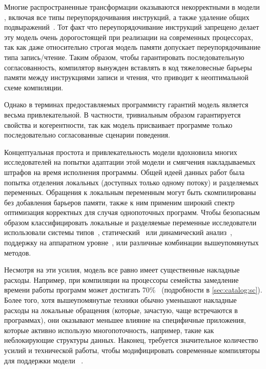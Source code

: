 Многие распространенные трансформации оказываются 
некорректными в модели \SC, включая 
все типы переупорядочивания инструкций, 
а также удаление общих подвыражений~\cite{Marino-al:PLDI11, Sevcik-Aspinall:ECOOP08}.
Тот факт что переупорядочивание инструкций запрещено 
делает эту модель очень дорогостоящей при реализации
на современных процессорах, так как даже 
относительно строгая модель памяти \Intel
допускает переупорядочивание типа запись/чтение. 
Таким образом, чтобы гарантировать последовательную согласованность, 
компилятор вынужден вставлять в код тяжеловесные 
барьеры памяти между инструкциями записи и чтения,
что приводит к неоптимальной схеме компиляции. 

Однако в терминах предоставляемых программисту гарантий 
модель \SC является весьма привлекательной. 
В частности, тривиальным образом гарантируется свойства \DRF и когерентности, 
так как модель присваивает программе только 
последовательно согласованные сценарии поведения. 

Концептуальная простота и привлекательность модели \SC 
вдохновила многих исследователей на попытки 
адаптации этой модели и смягчения накладываемых 
штрафов на время исполнения программы. 
Общей идеей данных работ была попытка 
отделения локальных (доступных только одному потоку) 
и разделяемых переменных.
Обращения к локальным переменным могут быть скомпилированы 
без добавления барьеров памяти, также к ним 
применим широкий спектр оптимизация корректных 
для случая однопоточных программ. 
Чтобы безопасным образом классифицировать 
локальные и разделяемые переменные исследователи 
использовали системы типов~\cite{Vollmer-al:PPoPP17},
статический~\cite{Singh-al:ISCA12} или динамический анализ~\cite{Liu-al:PLDI19}, 
поддержку на аппаратном уровне~\cite{Singh-al:ISCA12, Marino-al:PLDI10}, 
или различные комбинации вышеупомянутых методов.  

Несмотря на эти усилия, модель \SC все равно имеет существенные накладные расходы. 
Например, при компиляции на процессоры семейства 
замедление времени работы программ может достигать 70\%~\cite{Liu-al:PLDI19} 
(\see подробности в \cref{sec:catalog:sc}).
Более того, хотя вышеупомянутые техники обычно уменьшают 
накладные расходы на локальные обращения 
(которые, зачастую, чаще встречаются в программах),
они оказывают меньшее влияние на специфичные приложения, 
которые активно использую многопоточность, 
например, такие как неблокирующие структуры данных.
Наконец, требуется значительное количество усилий 
и технической работы, чтобы модифицировать 
современные компиляторы для поддержки модели \SC~\cite{Marino-al:PLDI11, Liu-al:PLDI19}.

